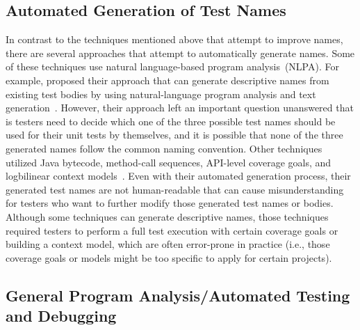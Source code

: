 \subsection{Automated Generation of Test Names}

In contrast to the techniques mentioned above that attempt to improve names, there are several approaches that attempt to automatically generate names.
%
Some of these techniques use natural language-based program analysis~(NLPA).
%
For example, \citeauthor{zhang2016towards} proposed their approach that can generate descriptive names from existing test bodies by using natural-language program analysis and text generation~\cite{zhang2016towards}.
%
However, their approach left an important question unanswered that is testers need to decide which one of the three possible test names should be used for their unit tests by themselves, and it is possible that none of the three generated names follow the common naming convention.
%
Other techniques utilized Java bytecode, method-call sequences, API-level coverage goals, and logbilinear context models~\cite{fraser2011evosuite,thummalapenta2009mseqgen,daka2017generating}.
%
Even with their automated generation process, their generated test names are not human-readable that can cause misunderstanding for testers who want to further modify those generated test names or bodies.
Although some techniques can generate descriptive names, those techniques required testers to perform a full test execution with certain coverage goals or building a context model, which are often error-prone in practice (i.e., those coverage goals or models might be too specific to apply for certain projects).


\subsection{General Program Analysis\slash Automated Testing and Debugging}

